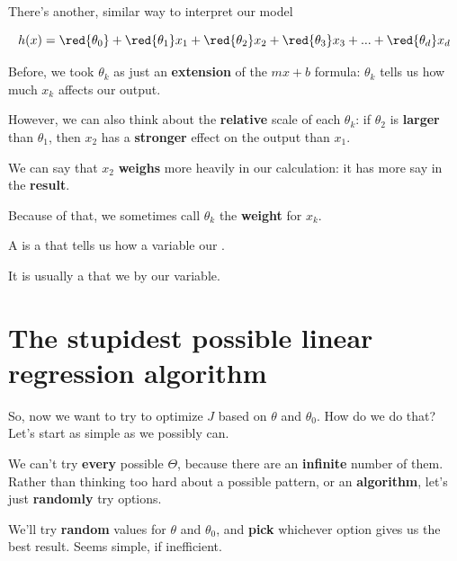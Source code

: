         There's another, similar way to interpret our model
        
        \begin{equation}
            h(x) = \red{\theta_0} + \red{\theta_1}x_1 + \red{\theta_2}x_2 + \red{\theta_3}x_3 + ... + \red{\theta_d}x_d
        \end{equation}
        
        Before, we took $\theta_k$ as just an \textbf{extension} of the $mx+b$ formula: $\theta_k$ tells us how much $x_k$ affects our output.
        
        However, we can also think about the \textbf{relative} scale of each $\theta_k$: if $\theta_2$ is \textbf{larger} than $\theta_1$, then $x_2$ has a \textbf{stronger} effect on the output than $x_1$.
        
        We can say that $x_2$ \textbf{weighs} more heavily in our calculation: it has more say in the \textbf{result}.
        
        Because of that, we sometimes call $\theta_k$ the \textbf{weight} for $x_k$.\\
        
        \begin{definition}
            A  is a  that tells us how  a variable  our .
            
            It is usually a  that we  by our variable.
        \end{definition}

\pagebreak

\section{The stupidest possible linear regression algorithm}
    
    So, now we want to try to optimize $J$ based on $\theta$ and $\theta_0$. How do we do that? Let's start as simple as we possibly can.
    
    We can't try \textbf{every} possible $\Theta$, because there are an \textbf{infinite} number of them. Rather than thinking too hard about a possible pattern, or an \textbf{algorithm}, let's just \textbf{randomly} try options.
    
    We'll try \textbf{random} values for $\theta$ and $\theta_0$, and \textbf{pick} whichever option gives us the best result. Seems simple, if inefficient.
    
